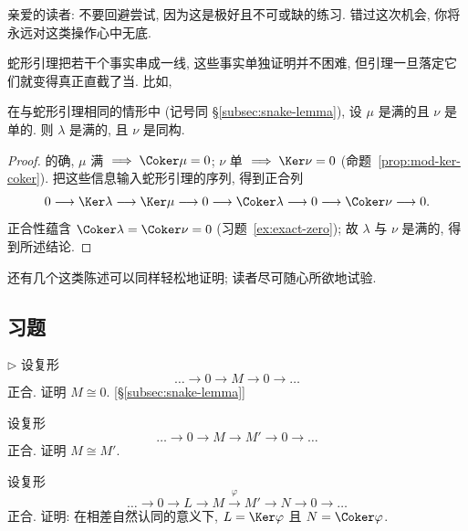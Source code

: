 亲爱的读者: 不要回避尝试, 因为这是极好且不可或缺的练习. 错过这次机会, 你将永远对这类操作心中无底.

蛇形引理把若干个事实串成一线, 这些事实单独证明并不困难, 但引理一旦落定它们就变得真正直截了当. 比如,

\begin{corollary}
\label{cor:short-five}
在与蛇形引理相同的情形中 (记号同 \S\ref{subsec:snake-lemma}), 设 $\mu$ 是满的且 $\nu$ 是单的. 则 $\lambda$ 是满的, 且 $\nu$ 是同构.
\end{corollary}

\begin{proof}
的确, $\mu$ 满 $\implies \Coker \mu = 0$; $\nu$ 单 $\implies \Ker \nu = 0$ (命题~\ref{prop:mod-ker-coker}). 把这些信息输入蛇形引理的序列, 得到正合列
\[
0 \longrightarrow \Ker \lambda \longrightarrow \Ker \mu \longrightarrow 0 \longrightarrow \Coker \lambda \longrightarrow 0 \longrightarrow \Coker \nu \longrightarrow 0.
\]
正合性蕴含 $\Coker \lambda = \Coker \nu = 0$ (习题~\ref{ex:exact-zero}); 故 $\lambda$ 与 $\nu$ 是满的, 得到所述结论.
\end{proof}

还有几个这类陈述可以同样轻松地证明; 读者尽可随心所欲地试验.

\subsection*{习题}
{}

\begin{prob}
\label{ex:exact-zero}
$\triangleright$ 设复形
\[
\dots \longrightarrow 0 \longrightarrow M \longrightarrow 0 \longrightarrow \dots
\]
正合. 证明 $M \cong 0$. [\S\ref{subsec:snake-lemma}]
\end{prob}

\begin{prob}
\label{ex:exact-iso}
设复形
\[
\dots \longrightarrow 0 \longrightarrow M \longrightarrow M' \longrightarrow 0 \longrightarrow \dots
\]
正合. 证明 $M \cong M'$.
\end{prob}

\begin{prob}
\label{ex:ker-coker-exact}
设复形
\[
\dots \longrightarrow 0 \longrightarrow L \longrightarrow M \xrightarrow{\ \varphi\ } M' \longrightarrow N \longrightarrow 0 \longrightarrow \dots
\]
正合. 证明: 在相差自然认同的意义下, $L = \Ker \varphi$ 且 $N = \Coker \varphi$.
\end{prob}

